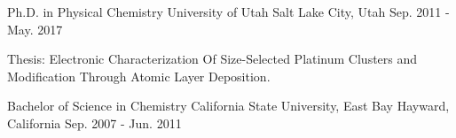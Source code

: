 


\begin{cventries}


\cventry
{Ph.D. in Physical Chemistry}
{University of Utah}
{Salt Lake City, Utah}
{Sep. 2011 - May. 2017}
{
\begin{cvitems}
\item {Thesis: Electronic Characterization Of Size-Selected Platinum Clusters
    and Modification Through Atomic Layer Deposition.}
\end{cvitems}
}

\cventry
{Bachelor of Science in Chemistry}
{California State University, East Bay}
{Hayward, California}
{Sep. 2007 - Jun. 2011}
{
}


\end{cventries}
